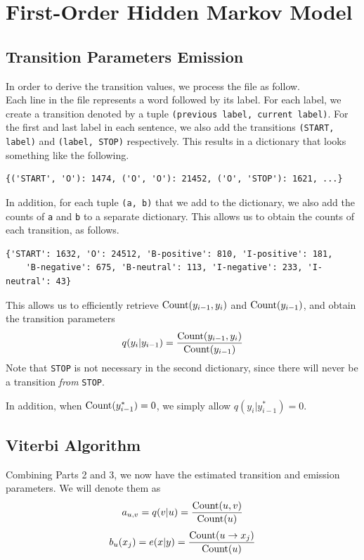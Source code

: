 \documentclass{article}
\numberwithin{equation}{section}
\begin{document}
\newpage
\section{First-Order Hidden Markov Model}
\subsection{Transition Parameters Emission}
In order to derive the transition values, we process the file as follow.\\
Each line in the file represents a word followed by its label. For each label, we create a transition denoted by a tuple \lstinline{(previous label, current label)}. For the first and last label in each sentence, we also add the transitions \lstinline{(START, label)} and \lstinline{(label, STOP)} respectively. This results in a dictionary that looks something like the following.

\begin{verbatim}
{('START', 'O'): 1474, ('O', 'O'): 21452, ('O', 'STOP'): 1621, ...}
\end{verbatim}

In addition, for each tuple \lstinline{(a, b)} that we add to the dictionary, we also add the counts of \lstinline{a} and \lstinline{b} to a separate dictionary. This allows us to obtain the counts of each transition, as follows.

\begin{verbatim}
{'START': 1632, 'O': 24512, 'B-positive': 810, 'I-positive': 181,
    'B-negative': 675, 'B-neutral': 113, 'I-negative': 233, 'I-neutral': 43}
\end{verbatim}

This allows us to efficiently retrieve $\text{\lstinline{Count}}(y_{i-1}, y_i)$ and $\text{\lstinline{Count}}(y_{i-1})$, and obtain the transition parameters
	$$q(y_i | y_{i-1}) = \frac{\text{\lstinline{Count}}(y_{i-1}, y_i)}{\text{\lstinline{Count}}(y_{i-1})}$$
Note that \lstinline{STOP} is not necessary in the second dictionary, since there will never be a transition \emph{from} \lstinline{STOP}.

In addition, when $\text{\lstinline{Count}}(y^*_{i-1}) = 0$, we simply allow $q(y_i | y^*_{i-1}) = 0$.

\subsection{Viterbi Algorithm}
Combining Parts 2 and 3, we now have the estimated transition and emission parameters. We will denote them as
	$$ a_{u, v} = q(v | u) = \frac{\text{\lstinline{Count}}(u, v)}{\text{\lstinline{Count}}(u)} $$
	$$ b_u(x_j) = e(x | y) = \frac{\text{\lstinline{Count}}(u \rightarrow x_j)}{\text{\lstinline{Count}}(u)} $$
\end{document}
